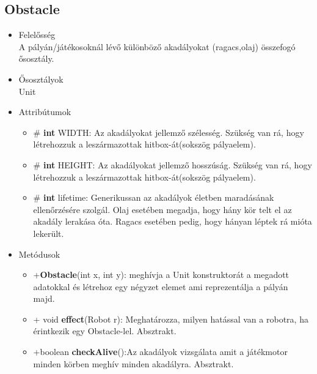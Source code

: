\subsection{Obstacle}
\begin{itemize}
\item Felelősség\\
A pályán/játékosoknál lévő különböző akadályokat (ragacs,olaj) összefogó ősosztály.
\item Ősosztályok\\
Unit
\item Attribútumok
	\begin{itemize}
		\item \# \textbf{int} WIDTH: Az akadályokat jellemző szélesség. Szükség van rá, hogy létrehozzuk a leszármazottak hitbox-át(sokszög pályaelem).
		\item \# \textbf{int} HEIGHT: Az akadályokat jellemző hosszúság. Szükség van rá, hogy létrehozzuk a leszármazottak hitbox-át(sokszög pályaelem).
			\item \# \textbf{int} lifetime: Generikussan az akadályok életben maradásának ellenőrzésére szolgál. Olaj esetében megadja, hogy hány kör telt el az akadály lerakása óta. Ragacs esetében pedig, hogy hányan léptek rá mióta lekerült. 
	\end{itemize}
\item Metódusok
	\begin{itemize}
		\item +\textbf{Obstacle}(int x, int y): meghívja a Unit konstruktorát a megadott adatokkal és létrehoz egy négyzet elemet ami reprezentálja a pályán majd.
		\item + void \textbf{effect}(Robot r): Meghatározza, milyen hatással van a robotra, ha érintkezik egy Obstacle-lel. Absztrakt.
		\item +boolean \textbf{checkAlive}():Az akadályok vizsgálata amit a játékmotor minden körben meghív minden akadályra. Absztrakt.
	\end{itemize}
\end{itemize}

